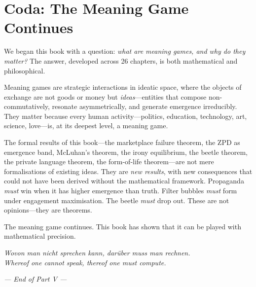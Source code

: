 \section{Coda: The Meaning Game Continues}
\label{sec:coda}

We began this book with a question: \emph{what are meaning games,
and why do they matter?}  The answer, developed across 26
chapters, is both mathematical and philosophical.

Meaning games are strategic interactions in ideatic space, where
the objects of exchange are not goods or money but \emph{ideas}---entities that compose non-commutatively, resonate asymmetrically,
and generate emergence irreducibly.  They matter because every
human activity---politics, education, technology, art, science,
love---is, at its deepest level, a meaning game.

The formal results of this book---the marketplace failure theorem,
the ZPD as emergence band, McLuhan's theorem, the irony
equilibrium, the beetle theorem, the private language theorem,
the form-of-life theorem---are not mere formalisations of existing
ideas.  They are \emph{new results}, with new consequences that
could not have been derived without the mathematical framework.
Propaganda \emph{must} win when it has higher emergence than truth.
Filter bubbles \emph{must} form under engagement maximisation.
The beetle \emph{must} drop out.  These are not opinions---they
are theorems.

The meaning game continues.  This book has shown that it can
be played with mathematical precision.

\bigskip

\begin{center}
\textit{Wovon man nicht sprechen kann, darüber muss man
\emph{rechnen}.}\\[6pt]
\textit{Whereof one cannot speak, thereof one must \emph{compute}.}
\end{center}

\bigskip
\begin{center}
\textit{--- End of Part V ---}
\end{center}
